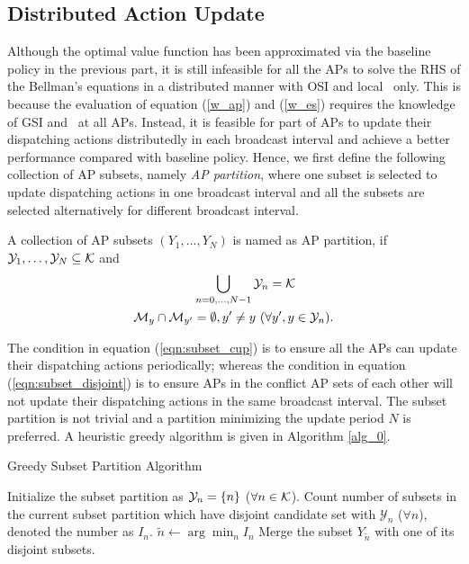 \subsection{Distributed Action Update}
\label{subsec:ap_alg}
Although the optimal value function has been approximated via the baseline policy in the previous part, it is still infeasible for all the APs to solve the RHS of the Bellman's equations in a distributed manner with OSI and local \brlatency~only.
This is because the evaluation of equation (\ref{w_ap}) and (\ref{w_es}) requires the knowledge of GSI and \brlatency~at all APs.
Instead, it is feasible for part of APs to update their dispatching actions distributedly in each broadcast interval and achieve a better performance compared with baseline policy.
Hence, we first define the following collection of AP subsets, namely \emph{AP partition}, where one subset is selected to update dispatching actions in one broadcast interval and all the subsets are selected alternatively for different broadcast interval.
\begin{definition}[AP Partition]
    A collection of AP subsets $(Y_1, ..., Y_N)$ is named as AP partition, if $\mathcal{Y}_{1}, \dots, \mathcal{Y}_{N} \subseteq \mathcal{K}$ and
    \begin{align}
        &\bigcup_{n=0,\dots,N-1} \mathcal{Y}_{n} = \mathcal{K}
        \label{eqn:subset_cup}
        \\
        \mathcal{M}_{y} \cap \mathcal{M}_{y'} &=\emptyset, y' \neq y~(\forall y',y \in \mathcal{Y}_{n}).
        \label{eqn:subset_disjoint}
    \end{align}
\end{definition}
The condition in equation (\ref{eqn:subset_cup}) is to ensure all the APs can update their dispatching actions periodically; whereas the condition in equation (\ref{eqn:subset_disjoint}) is to ensure APs in the conflict AP sets of each other will not update their dispatching actions in the same broadcast interval.
The subset partition is not trivial and a partition minimizing the update period $N$ is preferred.
A heuristic greedy algorithm is given in Algorithm \ref{alg_0}.
\begin{algorithm}[ht]
    \caption{Greedy Subset Partition Algorithm}\label{alg_0}
    \DontPrintSemicolon %
    Initialize the subset partition as $\mathcal{Y}_{n} = \{n\}$ ($\forall n\in\mathcal{K}$).\;
    {
        Count number of subsets in the current subset partition which have disjoint candidate set with $\mathcal{Y}_n$ ($\forall n$), denoted the number as $I_{n}$.\;
        $\tilde{n} \gets \arg\min_{n} I_{n}$\;
        Merge the subset $Y_{\tilde{n}}$ with one of its disjoint subsets.\;
    }
\end{algorithm}

